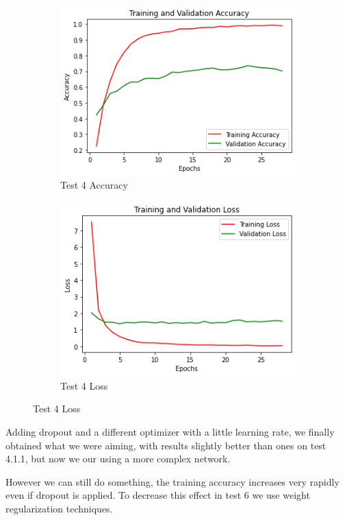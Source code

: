 \begin{figure}[H]
	\begin{subfigure}{0.5\textwidth}
		\includegraphics[width=0.9\linewidth]{img/vgg16/vgg16ft1dropacc.png} 
		\caption{Test 4 Accuracy}
		\label{fig:vgg16ft1dropacc}
	\end{subfigure}
	\begin{subfigure}{0.5\textwidth}
		\includegraphics[width=0.9\linewidth]{img/vgg16/vgg16ft1droploss.png}
		\caption{Test 4 Loss}
		\label{fig:vgg16ft1droploss}
	\end{subfigure}
\end{figure}


\noindent Adding dropout and a different optimizer with a little learning rate, we finally obtained what we were aiming, with results slightly better than ones on test 4.1.1, but now we our using a more complex network.

However we can still do something, the training accuracy increases very rapidly even if dropout is applied. To decrease this effect in test 6 we use weight regularization techniques.



